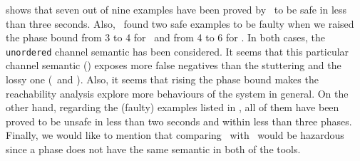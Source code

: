  shows that seven out of nine examples have been proved by \MPass\ to be safe in less than three seconds.
Also, \MPass\ found two safe examples to be faulty when we raised the phase bound from 3 to 4 for \Abp\ and from 4 to 6 for \Stp.
In both cases, the \texttt{unordered} channel semantic has been considered.
It seems that this particular channel semantic (\Ucs) exposes more false negatives than the stuttering and the lossy one (\Slcs\ and \Lcs).
%
Also, it seems that rising the phase bound makes the reachability analysis explore more behaviours of the system in general.
%
On the other hand, regarding the (faulty) examples listed in , all of them have been proved to be unsafe in less than two seconds and within less than three phases.
%
Finally, we would like to mention that comparing \alternator\ with \MPass\ would be hazardous since a phase does not have the same semantic in both of the tools.
%

